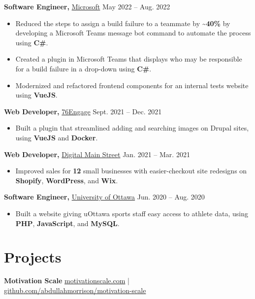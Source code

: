\documentclass[letterpaper]{article}
\begin{document}
\textbf{Software Engineer,}
\href{https://www.microsoft.com}{Microsoft} \hfill May 2022 -- Aug. 2022 \\
\vspace{-5pt}
\begin{itemize}
    \item Reduced the steps to assign a build failure to a teammate by \textasciitilde{}\textbf{40\%} by developing a Microsoft Teams message bot command to automate the process using \textbf{C\#}.
    \item Created a plugin in Microsoft Teams that displays who may be responsible for a build failure in a drop-down using \textbf{C\#}.
    \item Modernized and refactored frontend components for an internal tests website using \textbf{VueJS}.
\end{itemize}

\textbf{Web Developer,}
\href{https://76engage.com/}{76Engage} \hfill Sept. 2021 -- Dec. 2021 \\
\vspace{-5pt}
\begin{itemize}
    \item Built a plugin that streamlined adding and searching images on Drupal sites, using \textbf{VueJS} and \textbf{Docker}.
\end{itemize}

\textbf{Web Developer,}
\href{https://digitalmainstreet.ca/}{Digital Main Street} \hfill Jan. 2021 -- Mar. 2021 \\
\vspace{-5pt}
\begin{itemize}
    \item Improved sales for \textbf{12} small businesses with easier-checkout site redesigns on \textbf{Shopify}, \textbf{WordPress}, and \textbf{Wix}.
\end{itemize}

\textbf{Software Engineer,}
\href{https://www.uottawa.ca}{University of Ottawa} \hfill Jun. 2020 -- Aug. 2020 \\
\vspace{-5pt}
\begin{itemize}
    \item Built a website giving uOttawa sports staff easy access to athlete data, using \textbf{PHP}, \textbf{JavaScript}, and \textbf{MySQL}.
\end{itemize}

\vspace{-7.5pt}
\section{Projects}
\textbf{Motivation Scale} \hfill \href{https://motivationscale.com}{motivationscale.com} | \href{https://github.com/abdullahmorrison/motivation-scale}{github.com/abdullahmorrison/motivation-scale} \\
\end{document}
